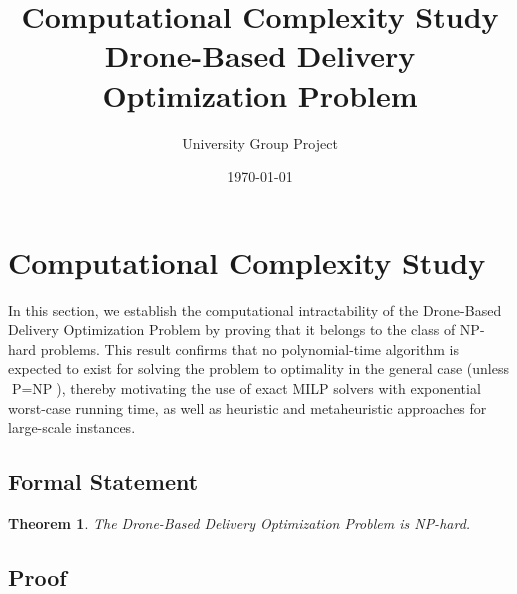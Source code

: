 \documentclass[11pt,a4paper]{article}
\title{\textbf{Computational Complexity Study}\\[0.3em]
\large Drone-Based Delivery Optimization Problem}
\author{University Group Project}
\date{\today}
\newtheorem{theorem}{Theorem}
\begin{document}
\maketitle

\section{Computational Complexity Study}

In this section, we establish the computational intractability of the Drone-Based Delivery Optimization Problem by proving that it belongs to the class of NP-hard problems. This result confirms that no polynomial-time algorithm is expected to exist for solving the problem to optimality in the general case (unless $\text{P} = \text{NP}$), thereby motivating the use of exact MILP solvers with exponential worst-case running time, as well as heuristic and metaheuristic approaches for large-scale instances.

\subsection{Formal Statement}

\begin{theorem}\label{thm:nphard}
The Drone-Based Delivery Optimization Problem is NP-hard.
\end{theorem}

\subsection{Proof}
\end{document}
